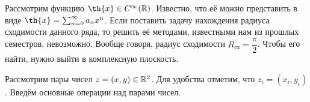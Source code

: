 \setcounter{section}{-1}

\noindent
\begin{minipage}[c]{0.3\textwidth}
    \centering
\end{minipage}%
\hfill
\begin{minipage}[c]{0.7\textwidth}
Рассмотрим функцию \(\th{x} \in C^{\infty} (\R)\). Известно, что её можно представить в виде 
\(\th{x} = \sum_{n = 0}^{\infty} a_n x^n\). Если поставить задачу нахождения радиуса сходимости 
данного ряда, то решить её методами, известными нам из прошлых семестров, невозможно. Вообще 
говоря, радиус сходимости \(R_{\text{сх}} = \dfrac{\pi}{2}\). Чтобы его найти, нужно выйти в 
комплексную плоскость.
\end{minipage}



Рассмотрим пары чисел \(z = (x, y) \in \mathbb{R}^2\). Для удобства отметим, что \(z_i = (x_i, y_i)\).
Введём основные операции над парами чисел.

